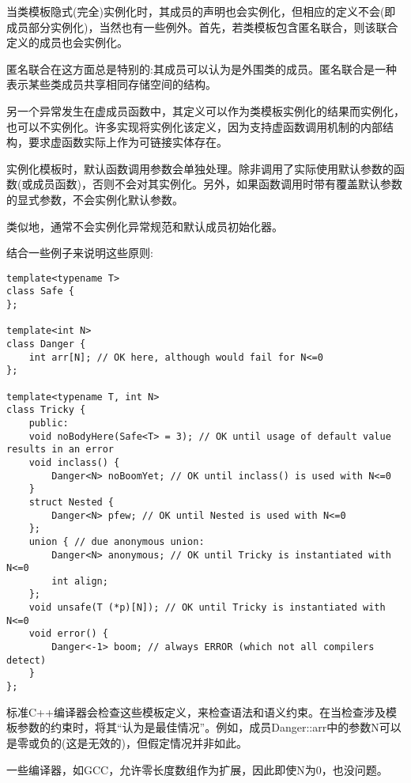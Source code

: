 当类模板隐式(完全)实例化时，其成员的声明也会实例化，但相应的定义不会(即成员部分实例化)，当然也有一些例外。首先，若类模板包含匿名联合，则该联合定义的成员也会实例化。

\begin{tcolorbox}[colback=webgreen!5!white,colframe=webgreen!75!black]
\hspace*{0.75cm}匿名联合在这方面总是特别的:其成员可以认为是外围类的成员。匿名联合是一种表示某些类成员共享相同存储空间的结构。
\end{tcolorbox}

另一个异常发生在虚成员函数中，其定义可以作为类模板实例化的结果而实例化，也可以不实例化。许多实现将实例化该定义，因为支持虚函数调用机制的内部结构，要求虚函数实际上作为可链接实体存在。 

实例化模板时，默认函数调用参数会单独处理。除非调用了实际使用默认参数的函数(或成员函数)，否则不会对其实例化。另外，如果函数调用时带有覆盖默认参数的显式参数，不会实例化默认参数。

类似地，通常不会实例化异常规范和默认成员初始化器。

结合一些例子来说明这些原则:

\begin{lstlisting}[style=styleCXX]
template<typename T>
class Safe {
};

template<int N>
class Danger {
	int arr[N]; // OK here, although would fail for N<=0
};

template<typename T, int N>
class Tricky {
	public:
	void noBodyHere(Safe<T> = 3); // OK until usage of default value results in an error
	void inclass() {
		Danger<N> noBoomYet; // OK until inclass() is used with N<=0
	}
	struct Nested {
		Danger<N> pfew; // OK until Nested is used with N<=0
	};
	union { // due anonymous union:
		Danger<N> anonymous; // OK until Tricky is instantiated with N<=0
		int align;
	};
	void unsafe(T (*p)[N]); // OK until Tricky is instantiated with N<=0
	void error() {
		Danger<-1> boom; // always ERROR (which not all compilers detect)
	}
};
\end{lstlisting}

标准C++编译器会检查这些模板定义，来检查语法和语义约束。在当检查涉及模板参数的约束时，将其“认为是最佳情况”。例如，成员Danger::arr中的参数N可以是零或负的(这是无效的)，但假定情况并非如此。

\begin{tcolorbox}[colback=webgreen!5!white,colframe=webgreen!75!black]
\hspace*{0.75cm}一些编译器，如GCC，允许零长度数组作为扩展，因此即使N为0，也没问题。
\end{tcolorbox}

